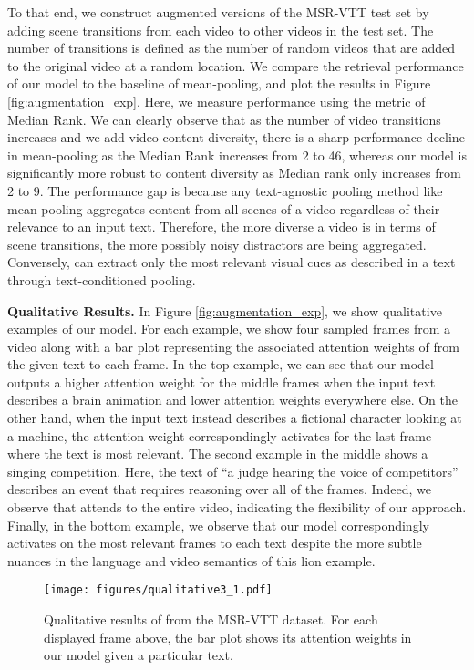 \documentclass[10pt,twocolumn,letterpaper]{article}
\begin{document}
To that end, we construct augmented versions
of the MSR-VTT test set by adding scene transitions from each video to other videos in the test set.
The number of transitions is defined as the number of random videos
that are added to the original video at a random location. We compare the  retrieval performance of our \ModelName{} model to the baseline of mean-pooling, and plot the results in Figure \ref{fig:augmentation_exp}. Here, we measure performance using the metric of Median Rank. We can clearly observe
that as the number of video transitions increases and we add video content diversity, there is a sharp performance decline in mean-pooling as the Median Rank increases
from 2 to 46, whereas our \ModelName{} model is significantly more robust to content diversity as Median rank only increases from 2 to 9. The performance gap is because any text-agnostic pooling method like mean-pooling aggregates content from all scenes of a video regardless of their relevance to an input text. Therefore, the more diverse a video is in terms of scene transitions, the more possibly noisy distractors are being aggregated. Conversely, \ModelName{} can extract only the most relevant visual cues as described in a text through text-conditioned pooling.

\textbf{Qualitative Results.}
In Figure \ref{fig:augmentation_exp}, we show qualitative examples of our \ModelName{} model. For each example, we show four sampled frames from a video along with a bar plot representing the associated attention weights of \ModelName{} from the given text to each frame. In the top example, we can see that our model outputs a higher attention weight for the middle frames when the input text describes a brain animation and lower attention weights everywhere else. On the other hand, when the input text instead describes a fictional character looking at a machine, the attention weight correspondingly activates for the last frame where the text is most relevant. The second example in the middle shows a singing competition. Here, the text of ``a judge hearing the voice of competitors'' describes an event that requires reasoning over all of the frames. Indeed, we observe that \ModelName{} attends to the entire video, indicating the flexibility of our approach. Finally, in the bottom example, we observe that our model correspondingly activates on the most relevant frames to each text despite the more subtle nuances in the language and video semantics of this lion example.

\begin{figure}[t]\centering \texttt{[image: figures/qualitative3\_1.pdf]}\\
\caption{Qualitative results of \ModelName{} from the MSR-VTT dataset. For each displayed frame above, the bar plot shows its attention weights in our model given a particular text.
  }
\label{fig:example3}
\end{figure}
\end{document}
